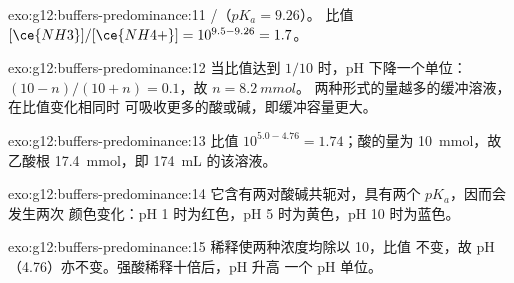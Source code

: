 \begin{solution}{exo:g12:buffers-predominance:11}
/（$pK_a = 9.26$）。
比值 $[\ce{NH3}]/[\ce{NH4+}] = 10^{9.5 - 9.26} = 1.7$。
\end{solution}

\begin{solution}{exo:g12:buffers-predominance:12}
当比值达到 $1/10$ 时，pH 下降一个单位：
$(10 - n)/(10 + n) = 0.1$，故 $n = \qty{8.2}{mmol}$。
两种形式的量越多的缓冲溶液，在比值变化相同时
可吸收更多的酸或碱，即缓冲容量更大。
\end{solution}

\begin{solution}{exo:g12:buffers-predominance:13}
比值 $10^{5.0 - 4.76} = 1.74$；酸的量为 \qty{10}{mmol}，故
乙酸根 \qty{17.4}{mmol}，即 \qty{174}{mL} 的该溶液。
\end{solution}

\begin{solution}{exo:g12:buffers-predominance:14}
它含有两对酸碱共轭对，具有两个 $pK_a$，因而会发生两次
颜色变化：pH 1 时为红色，pH 5 时为黄色，pH 10 时为蓝色。
\end{solution}

\begin{solution}{exo:g12:buffers-predominance:15}
稀释使两种浓度均除以 10，比值
不变，故 pH（4.76）亦不变。强酸稀释十倍后，pH 升高
一个 pH 单位。
\end{solution}

